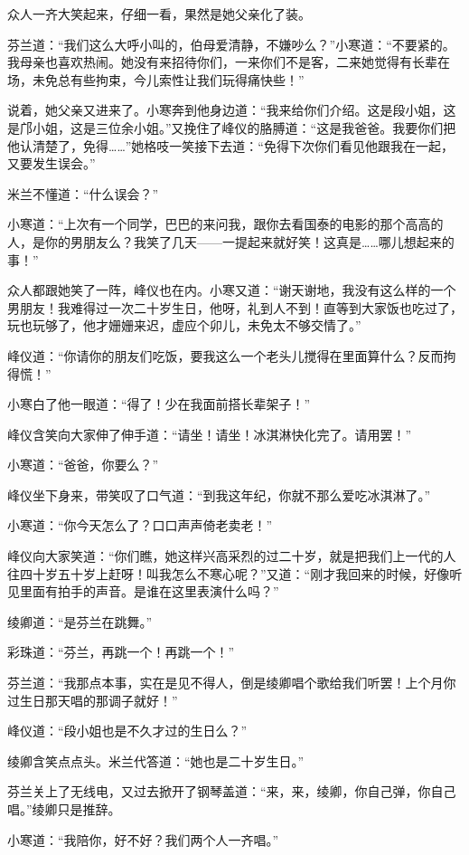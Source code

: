 \par 众人一齐大笑起来，仔细一看，果然是她父亲化了装。
\par 芬兰道：“我们这么大呼小叫的，伯母爱清静，不嫌吵么？”小寒道：“不要紧的。我母亲也喜欢热闹。她没有来招待你们，一来你们不是客，二来她觉得有长辈在场，未免总有些拘束，今儿索性让我们玩得痛快些！”
\par 说着，她父亲又进来了。小寒奔到他身边道：“我来给你们介绍。这是段小姐，这是邝小姐，这是三位余小姐。”又挽住了峰仪的胳膊道：“这是我爸爸。我要你们把他认清楚了，免得……”她格吱一笑接下去道：“免得下次你们看见他跟我在一起，又要发生误会。”
\par 米兰不懂道：“什么误会？”
\par 小寒道：“上次有一个同学，巴巴的来问我，跟你去看国泰的电影的那个高高的人，是你的男朋友么？我笑了几天——一提起来就好笑！这真是……哪儿想起来的事！”
\par 众人都跟她笑了一阵，峰仪也在内。小寒又道：“谢天谢地，我没有这么样的一个男朋友！我难得过一次二十岁生日，他呀，礼到人不到！直等到大家饭也吃过了，玩也玩够了，他才姗姗来迟，虚应个卯儿，未免太不够交情了。”
\par 峰仪道：“你请你的朋友们吃饭，要我这么一个老头儿搅得在里面算什么？反而拘得慌！”
\par 小寒白了他一眼道：“得了！少在我面前搭长辈架子！”
\par 峰仪含笑向大家伸了伸手道：“请坐！请坐！冰淇淋快化完了。请用罢！”
\par 小寒道：“爸爸，你要么？”
\par 峰仪坐下身来，带笑叹了口气道：“到我这年纪，你就不那么爱吃冰淇淋了。”
\par 小寒道：“你今天怎么了？口口声声倚老卖老！”
\par 峰仪向大家笑道：“你们瞧，她这样兴高采烈的过二十岁，就是把我们上一代的人往四十岁五十岁上赶呀！叫我怎么不寒心呢？”又道：“刚才我回来的时候，好像听见里面有拍手的声音。是谁在这里表演什么吗？”
\par 绫卿道：“是芬兰在跳舞。”
\par 彩珠道：“芬兰，再跳一个！再跳一个！”
\par 芬兰道：“我那点本事，实在是见不得人，倒是绫卿唱个歌给我们听罢！上个月你过生日那天唱的那调子就好！”
\par 峰仪道：“段小姐也是不久才过的生日么？”
\par 绫卿含笑点点头。米兰代答道：“她也是二十岁生日。”
\par 芬兰关上了无线电，又过去掀开了钢琴盖道：“来，来，绫卿，你自己弹，你自己唱。”绫卿只是推辞。
\par 小寒道：“我陪你，好不好？我们两个人一齐唱。”
